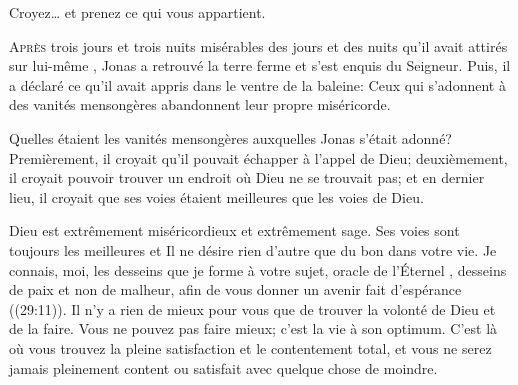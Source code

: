 Croyez\dots{} et prenez ce qui vous appartient. 

\dvrule







\lettrine{A}{près} trois jours et trois nuits misérables
 \ocadr des jours et des nuits qu'il avait attirés sur lui-même \fcadr{},
 Jonas a retrouvé la terre ferme et s'est enquis du Seigneur.
 Puis, il a déclaré ce qu'il avait appris dans le ventre de la baleine:
 \Og Ceux qui s'adonnent à des vanités mensongères abandonnent
 leur propre miséricorde. \Fg{}  

Quelles étaient les vanités mensongères auxquelles Jonas s'était adonné?
 Premièrement, il croyait qu'il pouvait échapper à l'appel de Dieu;
 deuxièmement, il croyait pouvoir trouver un endroit où Dieu
 ne se trouvait pas; et en dernier lieu, il croyait que ses voies
 étaient meilleures que les voies de Dieu. 


Dieu est extrêmement miséricordieux et extrêmement sage.
 Ses voies sont toujours les meilleures et Il ne désire rien d'autre
 que du bon dans votre vie.
 \Og Je connais, moi, les desseins que je forme à votre sujet,
 \ocadr oracle de l'Éternel \fcadr{}, desseins de paix et non de malheur,
 afin de vous donner un avenir fait d'espérance \Fg{} ((29:11)).
 Il n'y a rien de mieux pour vous que de trouver la volonté de Dieu
 et de la faire. Vous ne pouvez pas faire mieux; c'est la vie à son optimum.
 C'est là où vous trouvez la pleine satisfaction et le contentement total,
 et vous ne serez jamais pleinement content ou satisfait
 avec quelque chose de moindre. 

